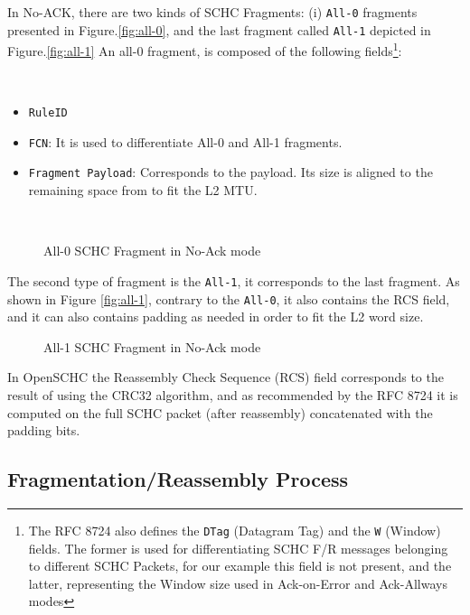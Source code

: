 In No-ACK, there are two kinds of SCHC Fragments: (i) \texttt{All-0} fragments presented in Figure.\ref{fig:all-0}, and the last fragment called \texttt{All-1} depicted in Figure.\ref{fig:all-1}
An all-0 fragment, is composed of the following fields\footnote{The RFC 8724 also defines the \texttt{DTag} (Datagram Tag) and the \texttt{W} (Window) fields. The former is used for differentiating SCHC F/R messages belonging to different SCHC Packets, for our example this field is not present, and the latter, representing the Window size used in Ack-on-Error and Ack-Allways modes}:

~

\begin{itemize}
    \item \texttt{RuleID}
    \item \texttt{FCN}: It is used to differentiate All-0 and All-1 fragments. 
    \item \texttt{Fragment Payload}: Corresponds to the payload. Its size is aligned to the remaining space from to fit the L2 MTU.
\end{itemize}

~

\begin{figure}[!ht] 
    \centering 
    
    \caption{All-0 SCHC Fragment in No-Ack mode} 
    \label{fig-all-0} 
\end{figure} 

The second type of fragment is the \texttt{All-1}, it corresponds to the last fragment. As shown in Figure \ref{fig:all-1}, contrary to the \texttt{All-0}, it also contains the RCS field, and it can also contains padding as needed in order to fit the L2 word size.

\begin{figure}[!ht] 
    \centering 
    
    \caption{All-1 SCHC Fragment in No-Ack mode} 
    \label{fig-all-1} 
\end{figure} 
   
In OpenSCHC the Reassembly Check Sequence (RCS) field corresponds to the result of using the CRC32 algorithm, and as recommended by the RFC 8724 it is computed on the full SCHC packet (after reassembly) concatenated with the padding bits.

\subsection{Fragmentation/Reassembly Process}

